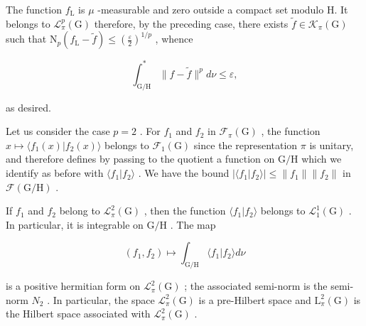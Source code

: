 The function \(f_{\mathrm{L}}\) is \(\mu\) -measurable and zero outside a compact set modulo H. It belongs to \(\mathcal{L}_{\pi}^{p}(\mathrm{G})\) therefore, by the preceding case, there exists \(\widetilde{f} \in \mathcal{K}_{\pi}(\mathrm{G})\) such that \(\mathrm{N}_p(f_{\mathrm{L}} - \widetilde{f}) \leqslant (\frac{\varepsilon}{2})^{1/p}\) , whence

\[
\int_ {\mathrm{G/H}} ^ {*} \| f - \widetilde {f} \| ^ {p} d \nu \leqslant \varepsilon ,
\]

as desired.

 Let us consider the case \(p = 2\) . For \(f_1\) and \(f_2\) in \(\mathcal{F}_{\pi}(\mathrm{G})\) , the function \(x \mapsto \langle f_1(x) | f_2(x) \rangle\) belongs to \(\mathcal{F}_1(\mathrm{G})\) since the representation \(\pi\) is unitary, and therefore defines by passing to the quotient a function on \(\mathrm{G / H}\) which we identify as before with \(\langle f_1 | f_2 \rangle\) . We have the bound \(|\langle f_1 | f_2 \rangle| \leqslant \| f_1 \| \| f_2 \|\) in \(\mathcal{F}(\mathrm{G / H})\) .

If \(f_1\) and \(f_2\) belong to \(\mathcal{L}_\pi^2(\mathrm{G})\) , then the function \(\langle f_1 | f_2 \rangle\) belongs to \(\mathcal{L}_1^1(\mathrm{G})\) . In particular, it is integrable on \(\mathrm{G/H}\) . The map

\[
(f _ {1}, f _ {2}) \mapsto \int_ {\mathrm{G} / \mathrm{H}} \langle f _ {1} | f _ {2} \rangle d \nu
\]

is a positive hermitian form on \(\mathcal{L}_{\pi}^{2}(\mathrm{G})\) ; the associated semi-norm is the semi-norm \(N_{2}\) . In particular, the space \(\mathcal{L}_{\pi}^{2}(\mathrm{G})\) is a pre-Hilbert space and \(\mathrm{L}_{\pi}^{2}(\mathrm{G})\) is the Hilbert space associated with \(\mathcal{L}_{\pi}^{2}(\mathrm{G})\) .

